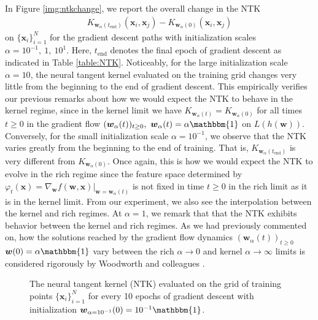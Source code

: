 \documentclass{article}
\begin{document}
In Figure \ref{img:ntkchange}, we report the overall change in the NTK
\begin{align*}
   K_{\boldsymbol{w}_{\alpha}(t_{\text{end}})}(\boldsymbol{x}_i, \boldsymbol{x}_j) -  K_{\boldsymbol{w}_{\alpha}(0)}(\boldsymbol{x}_i, \boldsymbol{x}_j)
\end{align*}
on $\{ \boldsymbol{x}_i \}_{i=1}^N$ for the gradient descent paths with initialization scales $\alpha = 10^{-1}, \ 1, \ 10^1$. Here, $t_{\text{end}}$ denotes the final epoch of gradient descent as indicated in Table \ref{table:NTK}. Noticeably, for the large initialization scale $\alpha = 10$, the neural tangent kernel evaluated on the training grid changes very little from the beginning to the end of gradient descent. This empirically verifies our previous remarks about how we would expect the NTK to behave in the kernel regime, since in the kernel limit we have $K_{\boldsymbol{w}_{\alpha}(t)} = K_{\boldsymbol{w}_{\alpha}(0)}$ for all times $t \geq 0$ in the gradient flow $(\boldsymbol{w}_{\alpha}(t))_{t \geq 0}, \ \boldsymbol{w}_{\alpha}(t) = \alpha \mathbbm{1}$ on $L(h(\boldsymbol{w}))$. Conversely, for the small initialization scale $\alpha = 10^{-1}$, we observe that the NTK varies greatly from the beginning to the end of training. That is, $K_{\boldsymbol{w}_{\alpha}(t_{\text{end}})}$ is very different from $K_{\boldsymbol{w}_{\alpha}(0)}$. Once again, this is how we would expect the NTK to evolve in the rich regime since the feature space determined by $\varphi_t(\boldsymbol{x}) = \nabla_{\boldsymbol{w}}f(\boldsymbol{w}, \boldsymbol{x})|_{\boldsymbol{w} = \boldsymbol{w}_{\alpha}(t)}$ is not fixed in time $t \geq 0$ in the rich limit as it is in the kernel limit. From our experiment, we also see the interpolation between the kernel and rich regimes. At $\alpha = 1$, we remark that that the NTK exhibits behavior between the kernel and rich regimes. As we had previously commented on, how the solutions reached by the gradient flow dynamics $(\boldsymbol{w}_{\alpha}(t))_{t \geq 0}$ $\boldsymbol{w}(0) = \alpha \mathbbm{1}$ vary between the rich $\alpha \rightarrow 0$ and kernel $\alpha \rightarrow \infty$ limits is considered rigorously by Woodworth and colleagues \cite{woodworth2020kernel}.

\begin{figure}[H]
\caption{The neural tangent kernel (NTK) evaluated on the grid of training points $\{ \boldsymbol{x}_i \}_{i=1}^N$ for every 10 epochs of gradient descent with initialization $\boldsymbol{w}_{\alpha = 10^{-1}}(0) = 10^{-1}\mathbbm{1}$.}\label{gif:ntk1}
\end{figure}
\end{document}
